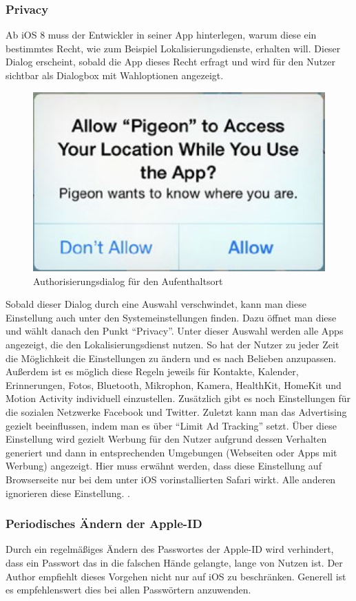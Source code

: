 		\subsubsection{Privacy}
			Ab iOS 8 muss der Entwickler in seiner App hinterlegen, warum diese ein
			bestimmtes Recht, wie zum Beispiel Lokalisierungsdienste, erhalten will.
			Dieser Dialog erscheint, sobald die App dieses Recht erfragt und wird für den
			Nutzer sichtbar als Dialogbox mit Wahloptionen angezeigt.
			\begin{figure}[h]
				\centering
				\includegraphics[width=0.4\linewidth]{ios/media/privacy-dialog.jpg}
				\caption{Authorisierungsdialog für den Aufenthaltsort 
				\cite[S.535]{LearnIOS7Dev2013}}
				\label{fig:privacy-dialog}
			\end{figure}
			Sobald dieser Dialog durch eine Auswahl verschwindet, kann man diese
			Einstellung auch unter den Systemeinstellungen finden. Dazu öffnet man diese
			und wählt danach den Punkt "`Privacy"'. Unter dieser Auswahl werden alle Apps
			angezeigt, die den Lokalisierungsdienst nutzen. So hat der Nutzer zu jeder
			Zeit die Möglichkeit die Einstellungen zu ändern und es nach Belieben
			anzupassen. Außerdem ist es möglich diese Regeln jeweils für
			Kontakte, Kalender, Erinnerungen, Fotos, Bluetooth, Mikrophon, Kamera,
			HealthKit, HomeKit und Motion Activity individuell einzustellen. Zusätzlich
			gibt es noch Einstellungen für die sozialen Netzwerke Facebook und Twitter.
			Zuletzt kann man das Advertising gezielt beeinflussen, indem man es über
			"`Limit Ad Tracking"' setzt. Über diese Einstellung wird gezielt Werbung für
			den Nutzer aufgrund dessen Verhalten generiert und dann in entsprechenden
			Umgebungen (Webseiten oder Apps mit Werbung) angezeigt. Hier muss erwähnt
			werden, dass diese Einstellung auf Browserseite nur bei dem unter iOS
			vorinstallierten Safari wirkt. Alle anderen ignorieren diese Einstellung.
			\cite{AppleMngPrivacy2015}\cite[S.131]{IKungFu2014}.
		\subsubsection{Periodisches Ändern der Apple-ID}
			Durch ein regelmäßiges Ändern des Passwortes der Apple-ID wird verhindert,
			dass ein Passwort das in die falschen Hände gelangte, lange von Nutzen ist.
			Der Author empfiehlt dieses Vorgehen nicht nur auf iOS zu beschränken.
			Generell ist es empfehlenswert dies bei allen Passwörtern anzuwenden.
